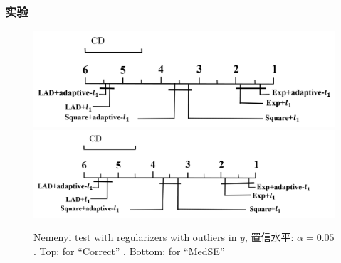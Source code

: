 \documentclass{beamer}
\begin{document}
\begin{frame}
\frametitle{实验}


\begin{figure}
  \centering

  \includegraphics[width=.75\linewidth]{picture/stat-table7-correct}
\vspace{3ex}
  \includegraphics[width=.75\linewidth]{picture/stat-table7-MedSE}
\caption{Nemenyi test with regularizers with outliers in $y$, 置信水平: $\alpha=0.05$.
Top:  for ``Correct'' , Bottom: for ``MedSE''
 }
  \label{fig-stat-table7}
\end{figure}

\end{frame}



\begin{frame}


  
  \end{frame}
\end{document}
